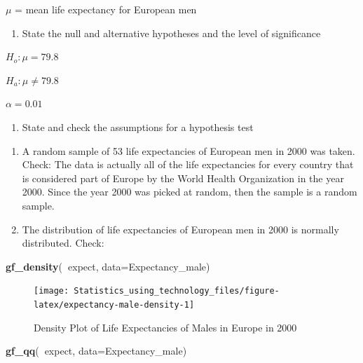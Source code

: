 \documentclass[
]{book}
\newenvironment{Shaded}{\begin{snugshade}}{\end{snugshade}}
\newcommand{\DataTypeTok}[1]{\textcolor[rgb]{0.13,0.29,0.53}{#1}}
\newcommand{\KeywordTok}[1]{\textcolor[rgb]{0.13,0.29,0.53}{\textbf{#1}}}
\newcommand{\NormalTok}[1]{#1}
\newcommand{\OperatorTok}[1]{\textcolor[rgb]{0.81,0.36,0.00}{\textbf{#1}}}
\providecommand{\tightlist}{%
  \setlength{\itemsep}{0pt}\setlength{\parskip}{0pt}}
\begin{document}
\(\mu\) = mean life expectancy for European men

\begin{enumerate}
\def\labelenumi{\arabic{enumi}.}
\setcounter{enumi}{1}
\tightlist
\item
  State the null and alternative hypotheses and the level of significance
\end{enumerate}

\(H_o:\mu=79.8\)

\(H_a:\mu\ne79.8\)

\(\alpha=0.01\)

\begin{enumerate}
\def\labelenumi{\arabic{enumi}.}
\setcounter{enumi}{2}
\tightlist
\item
  State and check the assumptions for a hypothesis test
\end{enumerate}

\begin{enumerate}
\def\labelenumi{\alph{enumi}.}
\item
  A random sample of 53 life expectancies of European men in 2000 was taken. Check: The data is actually all of the life expectancies for every country that is considered part of Europe by the World Health Organization in the year 2000. Since the year 2000 was picked at random, then the sample is a random sample.
\item
  The distribution of life expectancies of European men in 2000 is normally distributed. Check:
\end{enumerate}



\begin{Shaded}
\begin{Highlighting}[]
\KeywordTok{gf_density}\NormalTok{(}\OperatorTok{~}\NormalTok{expect, }\DataTypeTok{data=}\NormalTok{Expectancy_male)}
\end{Highlighting}
\end{Shaded}

\begin{figure}
\texttt{[image: Statistics\_using\_technology\_files/figure-latex/expectancy-male-density-1]} \caption{Density Plot of Life Expectancies of Males in Europe in 2000}\label{fig:expectancy-male-density}
\end{figure}



\begin{Shaded}
\begin{Highlighting}[]
\KeywordTok{gf_qq}\NormalTok{(}\OperatorTok{~}\NormalTok{expect, }\DataTypeTok{data=}\NormalTok{Expectancy_male)}
\end{Highlighting}
\end{Shaded}
\end{document}
